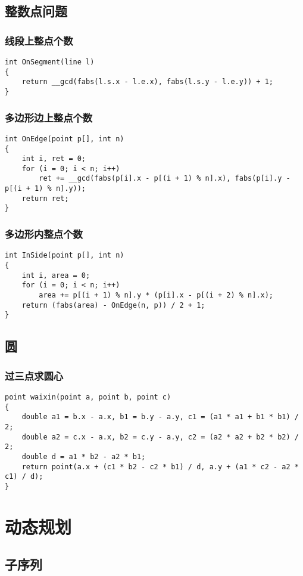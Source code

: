 \documentclass[a4]{article}
\begin{document}
\subsection{整数点问题}
\subsubsection{线段上整点个数}
\begin{lstlisting}
int OnSegment(line l)
{
    return __gcd(fabs(l.s.x - l.e.x), fabs(l.s.y - l.e.y)) + 1;
}
\end{lstlisting}
\subsubsection{多边形边上整点个数}
\begin{lstlisting}
int OnEdge(point p[], int n)
{
    int i, ret = 0;
    for (i = 0; i < n; i++)
        ret += __gcd(fabs(p[i].x - p[(i + 1) % n].x), fabs(p[i].y - p[(i + 1) % n].y));
    return ret;
}
\end{lstlisting}
\subsubsection{多边形内整点个数}
\begin{lstlisting}
int InSide(point p[], int n)
{
    int i, area = 0;
    for (i = 0; i < n; i++)
        area += p[(i + 1) % n].y * (p[i].x - p[(i + 2) % n].x);
    return (fabs(area) - OnEdge(n, p)) / 2 + 1;
}
\end{lstlisting}
\subsection{圆}
\subsubsection{过三点求圆心}
\begin{lstlisting}
point waixin(point a, point b, point c)
{
    double a1 = b.x - a.x, b1 = b.y - a.y, c1 = (a1 * a1 + b1 * b1) / 2;
    double a2 = c.x - a.x, b2 = c.y - a.y, c2 = (a2 * a2 + b2 * b2) / 2;
    double d = a1 * b2 - a2 * b1;
    return point(a.x + (c1 * b2 - c2 * b1) / d, a.y + (a1 * c2 - a2 * c1) / d);
}
\end{lstlisting}
\clearpage\section{动态规划}
\subsection{子序列}
\end{document}
